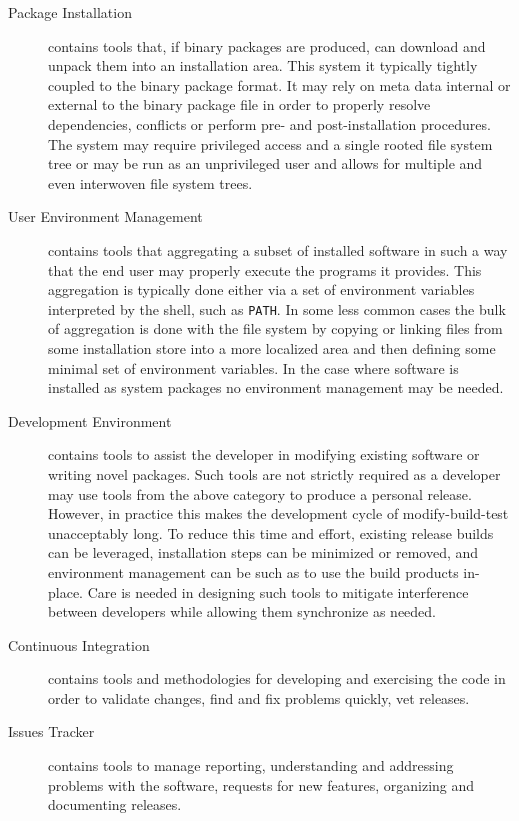 \begin{description}
\item[Package Installation] contains tools that, if binary
  packages are produced, can download and unpack them into an
  installation area.  This system it typically tightly coupled to the
  binary package format.  It may rely on meta data internal or
  external to the binary package file in order to properly resolve
  dependencies, conflicts or perform pre- and post-installation
  procedures.  The system may require privileged access and a single
  rooted file system tree or may be run as an unprivileged user and
  allows for multiple and even interwoven file system trees.

\item[User Environment Management] contains tools that aggregating a
  subset of installed software in such a way that the end user may
  properly execute the programs it provides.  This aggregation is
  typically done either via a set of environment variables interpreted
  by the shell, such as \texttt{PATH}.  In some less common cases the
  bulk of aggregation is done with the file system by copying or
  linking files from some installation store into a more localized
  area and then defining some minimal set of environment variables.
  In the case where software is installed as system packages no
  environment management may be needed.

\item[Development Environment] contains tools to assist the developer
  in modifying existing software or writing novel packages.  Such
  tools are not strictly required as a developer may use tools from
  the above category to produce a personal release.  However, in
  practice this makes the development cycle of modify-build-test
  unacceptably long.  To reduce this time and effort, existing release
  builds can be leveraged, installation steps can be minimized or
  removed, and environment management can be such as to use the build
  products in-place.  Care is needed in designing such tools to
  mitigate interference between developers while allowing them
  synchronize as needed.

\item[Continuous Integration] contains tools and methodologies for
  developing and exercising the code in order to validate changes,
  find and fix problems quickly, vet releases.

\item[Issues Tracker] contains tools to manage reporting,
  understanding and addressing problems with the software, requests
  for new features, organizing and documenting releases.


\end{description}

